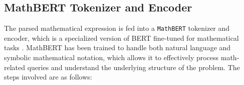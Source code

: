 \documentclass{article}
\begin{document}


\subsection{MathBERT Tokenizer and Encoder}

The parsed mathematical expression is fed into a \texttt{MathBERT} tokenizer and encoder, which is a specialized version of BERT fine-tuned for mathematical tasks \cite{mathBERT}. MathBERT has been trained to handle both natural language and symbolic mathematical notation, which allows it to effectively process math-related queries and understand the underlying structure of the problem. The steps involved are as follows:
\end{document}

